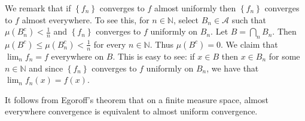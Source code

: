 \documentclass[12pt]{article}
\theoremstyle{definition}
\theoremstyle{remark}
\theoremstyle{plain}
\newcommand{\N}{\mathbb N}
\newcommand{\scrA}{{\mathscr A}}
\begin{document}
We remark that if $\left\{ f_n \right\}$ converges to $f$ almost uniformly then $\left\{ f_n \right\}$ converges to $f$ almost everywhere. To see this, for $n\in\N $, select $B_n \in \scrA$ such that $\mu \left( B_n ^c \right) < \frac{1}{n}$ and $\left\{ f_n \right\}$ converges to $f$ uniformly on $B_n$. Let $B=\bigcap_n {B_n}$. Then $\mu (B^c) \le \mu (B_n ^c) < \frac{1}{n} $ for every $n\in\N$. Thus $\mu \left( B^c \right)=0$. We claim that $\lim_n f_n = f$ everywhere on $B$. This is easy to see: if $x\in B$ then $x\in B_n$ for some $n\in\N$ and since $\left\{ f_n \right\}$ converges to $f$ uniformly on $B_n$, we have that $\lim_n f_n \left( x \right) = f\left( x \right)$.

It follows from Egoroff's theorem that on a finite measure space, almost everywhere convergence is equivalent to almost uniform convergence.
\end{document}
